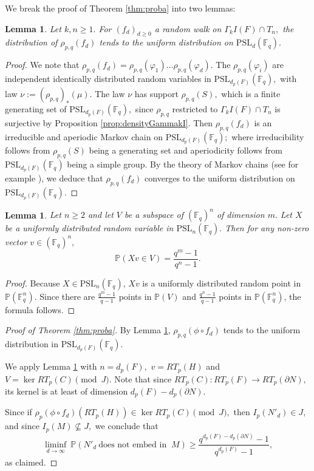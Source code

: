 \documentclass[12pt]{amsart}
\newtheorem{lem}[thm]{Lemma}
\theoremstyle{definition}
\begin{document}
We break the proof of Theorem \ref{thm:proba} into two lemmas:

\begin{lem}
	\label{lem:unifDistrib} Let $k,n\geq 1.$ For $(f_d)_{d\geq 0}$ a random walk on $\Gamma_kI(F)\cap T_n,$ the distribution of $\rho_{p,q}(f_d)$ tends to the uniform distribution on $\mathrm{PSL}_d(\mathbb{F}_q).$
\end{lem}
\begin{proof}
	We note that $\rho_{p,q}(f_d)=\rho_{p,q}(\varphi_1)\ldots \rho_{p,q}(\varphi_d).$ The $\rho_{p,q}(\varphi_i)$ are independent identically distributed random variables in $\mathrm{PSL}_{d_p(F)}(\mathbb{F}_q),$ with law $\nu:=\left(\rho_{p,q}\right)_*(\mu).$ The law $\nu$ has support $\rho_{p,q}(S),$ which is a finite generating set of $\mathrm{PSL}_{d_p(F)}(\mathbb{F}_q),$ since $\rho_{p,q}$ restricted to $\Gamma_kI(F)\cap T_n$ is surjective by Proposition \ref{prop:densityGammakI}. Then $\rho_{p,q}(f_d)$ is an irreducible and aperiodic Markov chain on $\mathrm{PSL}_{d_p(F)}(\mathbb{F}_q);$ where irreducibility follows from $\rho_{p,q}(S)$ being a generating set and aperiodicity follows from $\mathrm{PSL}_{d_p(F)}(\mathbb{F}_q)$ being a simple group. By the theory of Markov chains (see for example \cite[Theorem 4.9]{DPW09}), we deduce that $\rho_{p,q}(f_d)$ converges to the uniform distribution on $\mathrm{PSL}_{d_p(F)}(\mathbb{F}_q).$
\end{proof}

\begin{lem}
	\label{lemma:probaKernel} Let $n\geq 2$ and let $V$ be a subspace of $(\mathbb{F}_q)^n$ of dimension $m.$ Let $X$ be a uniformly distributed random variable in $\mathrm{PSL}_{n}(\mathbb{F}_q).$ Then for any non-zero vector $v\in (\mathbb{F}_q)^n,$
	$$\mathbb{P}(Xv\in V)=\frac{q^m-1}{q^n-1}.$$ 
\end{lem}
\begin{proof}
	Because $X\in \mathrm{PSL}_n(\mathbb{F}_q)$, $Xv$ is a uniformly distributed random point in $\mathbb{P}(\mathbb{F}_q^n)$. Since there are $\frac{q^m-1}{q-1}$ points in $\mathbb{P}(V)$ and $\frac{q^n-1}{q-1}$ points in $\mathbb{P}(\mathbb{F}_q^n)$, the formula follows.
\end{proof}
\begin{proof}[Proof of Theorem \ref{thm:proba}]
	By Lemma \ref{lem:unifDistrib}, $\rho_{p,q}(\phi \circ f_d)$ tends to the uniform distribution in $\mathrm{PSL}_{d_p(F)}(\mathbb{F}_q).$ 
	
	We apply Lemma \ref{lemma:probaKernel} with $n=d_p(F),$ $v=RT_p(H)$ and $V=\ker RT_p(C) \pmod{J}.$ Note that since $RT_p(C):RT_p(F)\longrightarrow RT_p(\partial N),$ its kernel is at least of dimension $d_p(F)-d_p(\partial N).$
	
	Since if $\rho_p(\phi\circ f_d)(RT_p(H)) \in \ker RT_p(C) \pmod{J},$ then $I_p(N'_d)\in J,$ and since $I_p(M)\nsubseteq J,$ we conclude that 
	$$\underset{d\rightarrow\infty}{\liminf} \ \mathbb{P}(N'_d \ \textrm{does not embed in } \ M)\geq \frac{q^{d_p(F)-d_p(\partial N)}-1}{q^{d_p(F)}-1},$$
	as claimed.
\end{proof}
\end{document}
